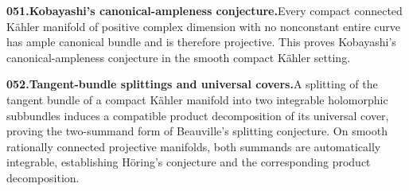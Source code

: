 \documentclass[11pt,a4paper]{article}
\begin{document}
  \par \begin{minipage}{\linewidth}
  \fontsize{10.5}{12.6}\selectfont\RaggedRight
  \hypertarget{result 051}{}
  {\bfseries\textcolor{muted}{051.}\enspace Kobayashi's canonical-ampleness conjecture.}\enspace Every compact connected K\"ahler manifold of positive complex dimension with no nonconstant entire curve has ample canonical bundle and is therefore projective. This proves Kobayashi's canonical-ampleness conjecture in the smooth compact K\"ahler setting.\par
  \end{minipage}\par\vspace{5pt}



  \par \begin{minipage}{\linewidth}
  \fontsize{10.5}{12.6}\selectfont\RaggedRight
  \hypertarget{result 052}{}
  {\bfseries\textcolor{muted}{052.}\enspace Tangent-bundle splittings and universal covers.}\enspace A splitting of the tangent bundle of a compact K\"ahler manifold into two integrable holomorphic subbundles induces a compatible product decomposition of its universal cover, proving the two-summand form of Beauville's splitting conjecture. On smooth rationally connected projective manifolds, both summands are automatically integrable, establishing H\"oring's conjecture and the corresponding product decomposition.\par
  \end{minipage}\par\vspace{5pt}
\end{document}
